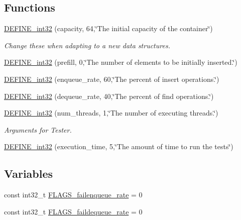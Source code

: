 \subsection*{Functions}
\begin{DoxyCompactItemize}
\item 
\hyperlink{ring-buffer_2test_object_8h_ae097569c222fef2d0a87e81290f2fd6e}{D\+E\+F\+I\+N\+E\+\_\+int32} (capacity, 64,\char`\"{}The initial capacity of the container\char`\"{})
\begin{DoxyCompactList}\small\item\em Change these when adapting to a new data structures. \end{DoxyCompactList}\item 
\hyperlink{ring-buffer_2test_object_8h_aee31cddaa60c8b36fe7c53b2648d2316}{D\+E\+F\+I\+N\+E\+\_\+int32} (prefill, 0,\char`\"{}The number of elements to be initially inserted.\char`\"{})
\item 
\hyperlink{ring-buffer_2test_object_8h_a097d7125898e2fa8bd73191b39d96893}{D\+E\+F\+I\+N\+E\+\_\+int32} (enqueue\+\_\+rate, 60,\char`\"{}The percent of insert operations.\char`\"{})
\item 
\hyperlink{ring-buffer_2test_object_8h_aad856a0079cce8fca0c6fb12c4c00e60}{D\+E\+F\+I\+N\+E\+\_\+int32} (dequeue\+\_\+rate, 40,\char`\"{}The percent of find operations.\char`\"{})
\item 
\hyperlink{ring-buffer_2test_object_8h_a96c3a19b14115217bfd3493b1488ba31}{D\+E\+F\+I\+N\+E\+\_\+int32} (num\+\_\+threads, 1,\char`\"{}The number of executing threads.\char`\"{})
\begin{DoxyCompactList}\small\item\em Arguments for Tester. \end{DoxyCompactList}\item 
\hyperlink{ring-buffer_2test_object_8h_a9478eb45e3743162c827d57e162c93bb}{D\+E\+F\+I\+N\+E\+\_\+int32} (execution\+\_\+time, 5,\char`\"{}The amount of time to run the tests\char`\"{})
\end{DoxyCompactItemize}
\subsection*{Variables}
\begin{DoxyCompactItemize}
\item 
const int32\+\_\+t \hyperlink{ring-buffer_2test_object_8h_a23ccddf5bb02f9fd5e3ef43e8e096e23}{F\+L\+A\+G\+S\+\_\+failenqueue\+\_\+rate} = 0
\item 
const int32\+\_\+t \hyperlink{ring-buffer_2test_object_8h_a3e86efa7993240673be15a1a66d84804}{F\+L\+A\+G\+S\+\_\+faildequeue\+\_\+rate} = 0
\end{DoxyCompactItemize}


